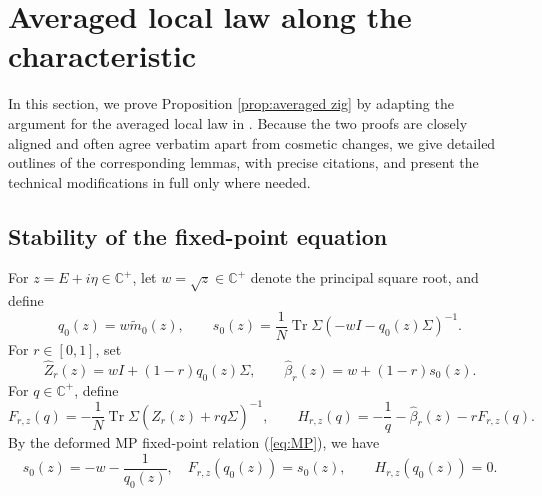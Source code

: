 \documentclass[11pt,reqno]{amsart}
\def\C{\mathbb{C}}
\def\Tr{\operatorname{Tr}}
\theoremstyle{definition}
\numberwithin{equation}{section}
\numberwithin{figure}{section}
\begin{document}
\section{Averaged local law along the characteristic}\label{sec:averaged}
In this section, we prove Proposition \ref{prop:averaged zig} by adapting the argument for the averaged local law in \cite[Theorem 2.5]{fan2026anisotropic}. Because the two proofs are closely aligned and often agree verbatim apart from cosmetic changes, we give detailed outlines of the corresponding lemmas, with precise citations, and present the technical modifications in full only where needed.

\subsection{Stability of the fixed-point equation}
For $z=E+i\eta\in\C^+$, let $w=\sqrt z\in\C^+$ denote the principal square root, and define
\begin{equation}\label{eq:deterministic-data}
 q_0(z)=w\widetilde m_0(z),\qquad
s_0(z)=\frac1N\Tr\Sigma (-wI-q_0(z)\Sigma)^{-1}.
\end{equation}
For $r\in[0,1]$, set
\begin{equation}\label{eq:interpolated-data}
 \widehat Z_r(z)=wI+(1-r)q_0(z)\Sigma,\qquad
 \widehat\beta_r(z)=w+(1-r)s_0(z).
\end{equation}
For $q\in\C^+$, define
\begin{equation}\label{eq:maps}
 F_{r,z}(q)=-\frac1N\Tr\Sigma(\widehat Z_r(z)+rq\Sigma)^{-1},
 \qquad
 H_{r,z}(q)=-\frac1q-\widehat\beta_r(z)-rF_{r,z}(q).
\end{equation}
By the deformed MP fixed-point relation (\ref{eq:MP}), we have
\begin{equation}\label{eq:fixed-root}
 s_0(z)=-w-\frac{1}{q_0(z)},\quad F_{r,z}(q_0(z))=s_0(z),\qquad H_{r,z}(q_0(z))=0.
\end{equation}
\end{document}
